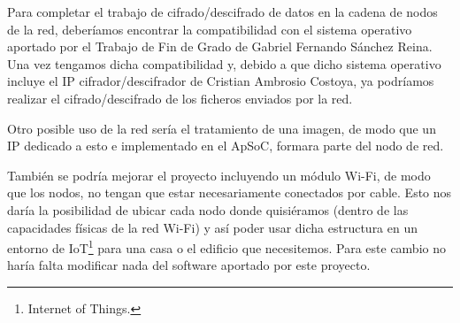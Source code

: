 Para completar el trabajo de cifrado/descifrado de datos en la cadena de nodos de la red, deberíamos encontrar la compatibilidad con el sistema operativo aportado por el Trabajo de Fin de Grado de Gabriel Fernando Sánchez Reina. Una vez tengamos dicha compatibilidad y, debido a que dicho sistema operativo incluye el IP cifrador/descifrador de Cristian Ambrosio Costoya, ya podríamos realizar el cifrado/descifrado de los ficheros enviados por la red.

Otro posible uso de la red sería el tratamiento de una imagen, de modo que un IP dedicado a esto e implementado en el ApSoC, formara parte del nodo de red.

También se podría mejorar el proyecto incluyendo un módulo Wi-Fi, de modo que los nodos, no tengan que estar necesariamente conectados por cable. Esto nos daría la posibilidad de ubicar cada nodo donde quisiéramos (dentro de las capacidades físicas de la red Wi-Fi) y así poder usar dicha estructura en un entorno de IoT\footnote{Internet of Things.} para una casa o el edificio que necesitemos. Para este cambio no haría falta modificar nada del software aportado por este proyecto.
